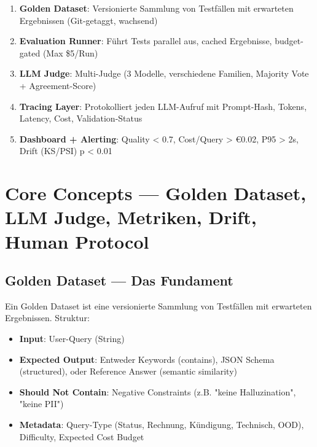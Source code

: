 \begin{enumerate}
    \item \textbf{Golden Dataset}: Versionierte Sammlung von Testfällen mit erwarteten Ergebnissen (Git-getaggt, wachsend)
    \item \textbf{Evaluation Runner}: Führt Tests parallel aus, cached Ergebnisse, budget-gated (Max \$5/Run)
    \item \textbf{LLM Judge}: Multi-Judge (3 Modelle, verschiedene Familien, Majority Vote + Agreement-Score)
    \item \textbf{Tracing Layer}: Protokolliert jeden LLM-Aufruf mit Prompt-Hash, Tokens, Latency, Cost, Validation-Status
    \item \textbf{Dashboard + Alerting}: Quality < 0.7, Cost/Query > €0.02, P95 > 2s, Drift (KS/PSI) p < 0.01
\end{enumerate}


\section{Core Concepts — Golden Dataset, LLM Judge, Metriken, Drift, Human Protocol}

\subsection{Golden Dataset — Das Fundament}

Ein Golden Dataset ist eine versionierte Sammlung von Testfällen mit erwarteten Ergebnissen. Struktur:

\begin{itemize}
    \item \textbf{Input}: User-Query (String)
    \item \textbf{Expected Output}: Entweder Keywords (contains), JSON Schema (structured), oder Reference Answer (semantic similarity)
    \item \textbf{Should Not Contain}: Negative Constraints (z.B. "keine Halluzination", "keine PII")
    \item \textbf{Metadata}: Query-Type (Status, Rechnung, Kündigung, Technisch, OOD), Difficulty, Expected Cost Budget
\end{itemize}

